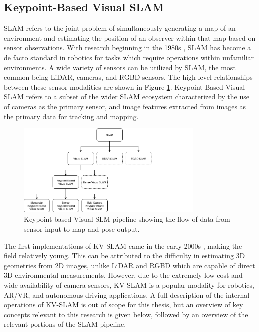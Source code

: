 \subsection{Keypoint-Based Visual SLAM}
\label{sec:kv_slam_background}

SLAM refers to the joint problem of simultaneously generating a map of an environment and estimating the position of an observer within that map based on sensor observations. With research beginning in the 1980s \cite{smithEstimatingUncertainSpatial1988}, SLAM has become a de facto standard in robotics for tasks which require operations within unfamiliar environments. A wide variety of sensors can be utilized by SLAM, the most common being LiDAR, cameras, and RGBD sensors. The high level relationships between these sensor modalities are shown in Figure \ref{fig:slam_family_tree}. Keypoint-Based Visual SLAM refers to a subset of the wider SLAM ecosystem characterized by the use of cameras as the primary sensor, and image features extracted from images as the primary data for tracking and mapping.

\begin{figure}[!ht]
    \centering
    \includegraphics[width=0.8\textwidth]{resources/slam_family_tree.png}
    \caption{Keypoint-based Visual SLM pipeline showing the flow of data from sensor input to map and pose output.}
    \label{fig:slam_family_tree}
\end{figure}

The first implementations of KV-SLAM came in the early 2000s \cite{seMobileRobotLocalization2002}\cite{davisonRealtimeSimultaneousLocalisation2003}, making the field relatively young. This can be attributed to the difficulty in estimating 3D geometries from 2D images, unlike LiDAR and RGBD which are capable of direct 3D environmental measurements. However, due to the extremely low cost and wide availability of camera sensors, KV-SLAM is a popular modality for robotics, AR/VR, and autonomous driving applications. A full description of the internal operations of KV-SLAM is out of scope for this thesis, but an overview of key concepts relevant to this research is given below, followed by an overview of the relevant portions of the SLAM pipeline.

